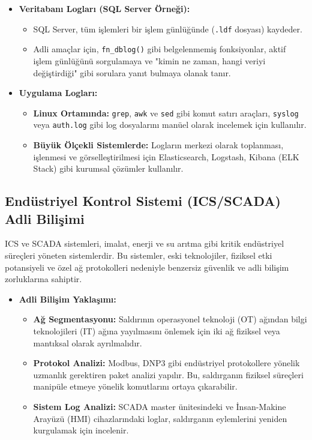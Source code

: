 \begin{itemize}
    \item \textbf{Veritabanı Logları (SQL Server Örneği):}
    \begin{itemize}
        \item SQL Server, tüm işlemleri bir işlem günlüğünde (\texttt{.ldf} dosyası) kaydeder.
        \item Adli amaçlar için, \texttt{fn\_dblog()} gibi belgelenmemiş fonksiyonlar, aktif işlem günlüğünü sorgulamaya ve "kimin ne zaman, hangi veriyi değiştirdiği" gibi sorulara yanıt bulmaya olanak tanır.
    \end{itemize}
    \item \textbf{Uygulama Logları:}
    \begin{itemize}
        \item \textbf{Linux Ortamında:} \texttt{grep}, \texttt{awk} ve \texttt{sed} gibi komut satırı araçları, \texttt{syslog} veya \texttt{auth.log} gibi log dosyalarını manüel olarak incelemek için kullanılır.
        \item \textbf{Büyük Ölçekli Sistemlerde:} Logların merkezi olarak toplanması, işlenmesi ve görselleştirilmesi için Elasticsearch, Logstash, Kibana (ELK Stack) gibi kurumsal çözümler kullanılır.
    \end{itemize}
\end{itemize}

\subsection{Endüstriyel Kontrol Sistemi (ICS/SCADA) Adli Bilişimi}

ICS ve SCADA sistemleri, imalat, enerji ve su arıtma gibi kritik endüstriyel süreçleri yöneten sistemlerdir. Bu sistemler, eski teknolojiler, fiziksel etki potansiyeli ve özel ağ protokolleri nedeniyle benzersiz güvenlik ve adli bilişim zorluklarına sahiptir.

\begin{itemize}
    \item \textbf{Adli Bilişim Yaklaşımı:}
    \begin{itemize}
        \item \textbf{Ağ Segmentasyonu:} Saldırının operasyonel teknoloji (OT) ağından bilgi teknolojileri (IT) ağına yayılmasını önlemek için iki ağ fiziksel veya mantıksal olarak ayrılmalıdır.
        \item \textbf{Protokol Analizi:} Modbus, DNP3 gibi endüstriyel protokollere yönelik uzmanlık gerektiren paket analizi yapılır. Bu, saldırganın fiziksel süreçleri manipüle etmeye yönelik komutlarını ortaya çıkarabilir.
        \item \textbf{Sistem Log Analizi:} SCADA master ünitesindeki ve İnsan-Makine Arayüzü (HMI) cihazlarındaki loglar, saldırganın eylemlerini yeniden kurgulamak için incelenir.
    \end{itemize}
\end{itemize}

